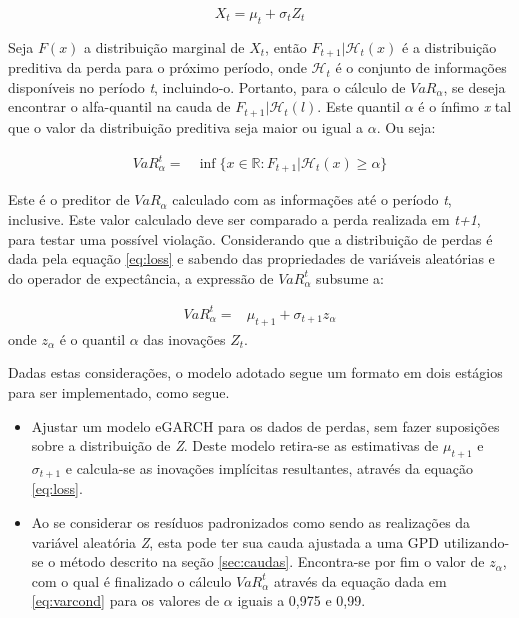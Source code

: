 \documentclass[1p]{elsarticle}
\theoremstyle{definition}
\begin{document}
\begin{equation}
\label{eq:loss}
X_t=\mu_t+\sigma_t Z_t
\end{equation}

Seja $F(x)$ a distribuição marginal de $X_t$, então $F_{t+1} | \mathcal{H}_t(x)$ é a distribuição preditiva da perda para o próximo período, onde $\mathcal{H}_t$ é o conjunto de informações disponíveis no período \emph{t}, incluindo-o. Portanto, para o cálculo de $VaR_\alpha$, se deseja encontrar o alfa-quantil na cauda de $F_{t+1} | \mathcal{H}_t(l)$. Este quantil $\alpha$ é o ínfimo \emph{x} tal que o valor da distribuição preditiva seja maior ou igual a $\alpha$. Ou seja:

\begin{align}
VaR_\alpha^t=&\inf\{x \in \mathbb{R}: F_{t+1} | \mathcal{H}_t(x) \geq \alpha\}
\end{align}

Este é o preditor de $VaR_\alpha$ calculado com as informações até o período \emph{t}, inclusive. Este valor calculado deve ser comparado a perda realizada em \emph{t+1}, para testar uma possível violação.
Considerando que a distribuição de perdas é dada pela equação \eqref{eq:loss} e sabendo das propriedades de variáveis aleatórias e do operador de expectância, a expressão de $VaR_\alpha^t$ subsume a:

\begin{align}
\label{eq:varcond} 
VaR_\alpha^t=&\mu_{t+1}+\sigma_{t+1}z_\alpha 
\end{align}
onde $z_\alpha$ é o quantil $\alpha$ das inovações $Z_t$.

Dadas estas considerações, o modelo adotado segue um formato em dois estágios para ser implementado, como segue.
\begin{itemize}
	\item Ajustar um modelo eGARCH para os dados de perdas, sem fazer suposições sobre a distribuição de \emph{Z}. Deste modelo retira-se as estimativas de $\mu_{t+1}$ e $\sigma_{t+1}$ e calcula-se as inovações implícitas resultantes, através da equação \eqref{eq:loss}.
	\item Ao se considerar os resíduos padronizados como sendo as realizações da variável aleatória \emph{Z}, esta pode ter sua cauda ajustada a uma GPD utilizando-se o método descrito na seção \ref{sec:caudas}. Encontra-se por fim o valor de $z_\alpha$, com o qual é finalizado o cálculo $VaR_\alpha^t$ através da equação dada em \eqref{eq:varcond} para os valores de $\alpha$ iguais a 0,975 e 0,99.
\end{itemize}
\end{document}

